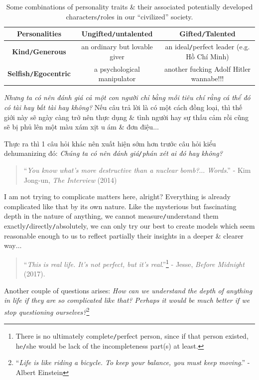 \documentclass[12pt]{article}
\begin{document}
\begin{table}[h]
	\centering
	\begin{tabular}{|c|c|c|}
		\hline
		{\sc Personalities}& \textbf{Ungifted{\tt/}untalented} & \textbf{Gifted{\tt/}Talented} \\
		\hline
		\textbf{Kind{\tt/}Generous} & an ordinary but lovable giver & an ideal{\tt/}perfect leader (e.g. Hồ Chí Minh) \\
		\hline
		\textbf{Selfish{\tt/}Egocentric} & a psychological manipulator & another fucking Adolf Hitler wannabe!!! \\
		\hline
	\end{tabular}
	\caption{Some combinations of personality traits \& their associated potentially developed characters{\tt/}roles in our ``civilized'' society.}
\end{table}
{\it Nhưng ta có nên đánh giá cả một con người chỉ bằng mỗi tiêu chí rằng cá thể đó có tài hay bất tài hay không?} Nếu câu trả lời là có một cách đồng loại, thì thế giới này sẽ ngày càng trở nên thực dụng \& tình người hay sự thấu cảm rồi cũng sẽ bị phủ lên một màu xám xịt u ám \& đơn điệu$\ldots$

Thực ra thì 1 câu hỏi khác nên xuất hiện sớm hơn trước câu hỏi kiểu dehumanizing đó: {\it Chúng ta có nên đánh giá{\tt/}phán xét ai đó hay không?}
\begin{quotation}
	``{\it You know what's more destructive than a nuclear bomb?$\ldots$ Words}.'' - Kim Jong-un, {\it The Interview} (2014)
\end{quotation}
I am not trying to complicate matters here, alright? Everything is already complicated like that by its own nature. Like the mysterious but fascinating depth in the nature of anything, we cannot measure{\tt/}understand them exactly{\tt/}directly{\tt/}absolutely, we can only try our best to create models which seem reasonable enough to us to reflect partially their insights in a deeper \& clearer way$\ldots$

\begin{quotation}
	``{\it This is real life. It's not perfect, but it's real}.''\footnote{There is no ultimately complete{\tt/}perfect person, since if that person existed, he{\tt/}she would be lack of the incompleteness part(s) at least.} - Jesse, {\it Before Midnight} (2017).
\end{quotation}
Another couple of questions arises: {\it How can we understand the depth of anything in life if they are so complicated like that? Perhaps it would be much better if we stop questioning ourselves?}\footnote{``{\it Life is like riding a bicycle. To keep your balance, you must keep moving}.'' - Albert Einstein}
\end{document}
